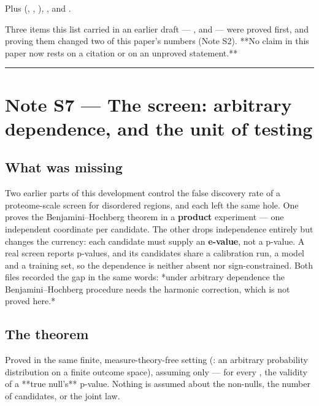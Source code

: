 Plus  (,
, ),
, and
.

Three items this list carried in an earlier draft ---
,  and
 --- were proved first, and proving them changed two
of this paper's numbers (Note S2). **No claim in this paper now rests on a
citation or on an unproved statement.**


\vspace{0.5em}\hrule\vspace{0.8em}



\section*{Note S7 --- The screen: arbitrary dependence, and the unit of testing}


\subsection*{What was missing}

Two earlier parts of this development control the false discovery rate of a
proteome-scale screen for disordered regions, and each left the same hole. One
proves the Benjamini--Hochberg theorem in a \textbf{product} experiment --- one
independent coordinate per candidate. The other drops independence entirely but
changes the currency: each candidate must supply an \textbf{e-value}, not a p-value.
A real screen reports p-values, and its candidates share a calibration run, a
model and a training set, so the dependence is neither absent nor
sign-constrained. Both files recorded the gap in the same words: *under
arbitrary dependence the Benjamini--Hochberg procedure needs the harmonic
correction, which is not proved here.*


\subsection*{The theorem}

Proved in the same finite, measure-theory-free setting (: an arbitrary
probability distribution on a finite outcome space), assuming only
 ---  for every , the validity of a **true
null's** p-value. Nothing is assumed about the non-nulls, the number of
candidates, or the joint law.

